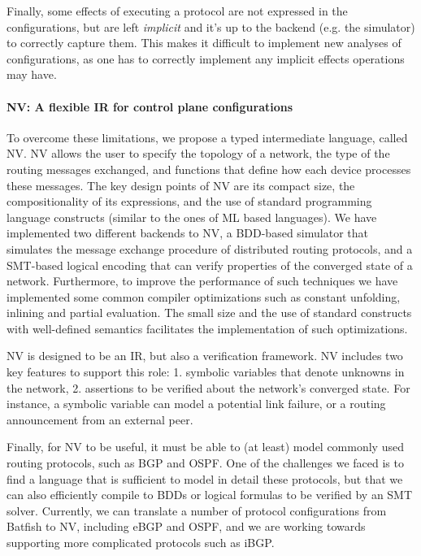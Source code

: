 \documentclass[sigconf,10pt]{acmart}
\begin{document}
Finally, some effects of executing a protocol are not expressed in the
configurations, but are left \emph{implicit} and it's up to the
backend (e.g. the simulator) to correctly capture
them. This makes it difficult to implement new analyses of
configurations, as one has to correctly implement any implicit effects
operations may have.

\paragraph{NV: A flexible IR for control plane configurations}

To overcome these limitations, we propose a typed intermediate
language, called NV. NV allows the user to specify the topology of a
network, the type of the routing messages exchanged, and functions
that define how each device processes these messages. The key design
points of NV are its compact size, the compositionality of its
expressions, and the use of standard programming language constructs
(similar to the ones of ML based languages). We have implemented two
different backends to NV, a BDD-based simulator that simulates the
message exchange procedure of distributed routing protocols, and a
SMT-based logical encoding that can verify properties of the
converged state of a network. Furthermore, to improve the
performance of such techniques we have implemented some common
compiler optimizations such as constant unfolding, inlining and
partial evaluation. The small size and the use of standard constructs
with well-defined semantics facilitates the
implementation of such optimizations.

NV is designed to be an IR, but also a verification framework. NV
includes two key features to support this role: 1. symbolic variables
that denote unknowns in the network, 2. assertions to be verified
about the network's converged state. For instance, a symbolic variable
can model a potential link failure, or a routing announcement from an
external peer.

Finally, for NV to be useful, it must be able to (at least) model
commonly used routing protocols, such as BGP and OSPF. One of the
challenges we faced is to find a language that is sufficient to model
in detail these protocols, but that we can also
efficiently compile to BDDs or logical formulas to be verified by an
SMT solver. Currently, we can translate a number of protocol
configurations from Batfish to NV, including eBGP and OSPF, and we are
working towards supporting more complicated protocols such as iBGP.
\end{document}
